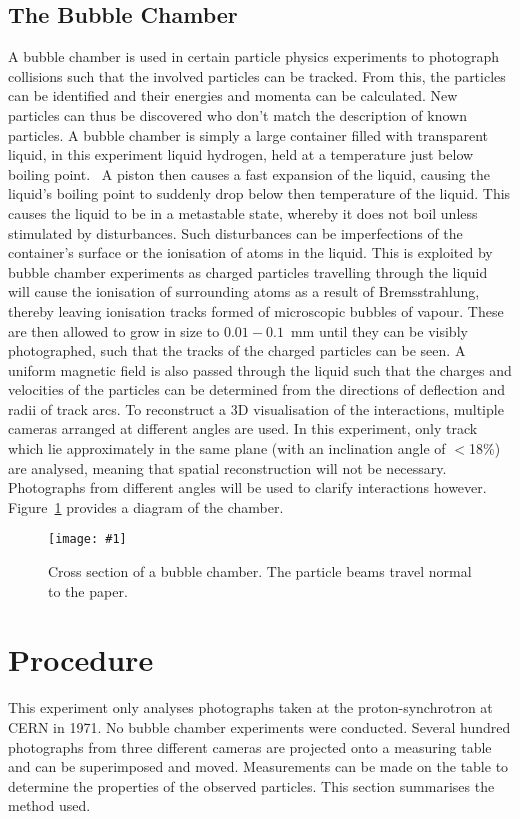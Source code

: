 \documentclass[twocolumn]{article}
\newcommand{\insertFigure}[1]{%
   \texttt{[image: \#1]}%
}
\begin{document}
\subsection{The Bubble Chamber}
A bubble chamber is used in certain particle physics experiments to photograph collisions such that the involved particles can be tracked. From this, the particles can be identified and their energies and momenta can be calculated. New particles can thus be discovered who don't match the description of known particles. A bubble chamber is simply a large container filled with transparent liquid, in this experiment liquid hydrogen, held at a temperature just below boiling point.~\cite{seul} A piston then causes a fast expansion of the liquid, causing the liquid's boiling point to suddenly drop below then temperature of the liquid. This causes the liquid to be in a metastable state, whereby it does not boil unless stimulated by disturbances. Such disturbances can be imperfections of the container's surface or the ionisation of atoms in the liquid. This is exploited by bubble chamber experiments as charged particles travelling through the liquid will cause the ionisation of surrounding atoms as a result of Bremsstrahlung, thereby leaving ionisation tracks formed of microscopic bubbles of vapour. These are then allowed to grow in size to $0.01-0.1$~mm until they can be visibly photographed, such that the tracks of the charged particles can be seen. A uniform magnetic field is also passed through the liquid such that the charges and velocities of the particles can be determined from the directions of deflection and radii of track arcs. To reconstruct a 3D visualisation of the interactions, multiple cameras arranged at different angles are used. In this experiment, only track which lie approximately in the same plane (with an inclination angle of $<$18\%) are analysed, meaning that spatial reconstruction will not be necessary. Photographs from different angles will be used to clarify interactions however. Figure~\ref{fig:bubble} provides a diagram of the chamber. 
\begin{figure}[!h]
	\centering
	\insertFigure{bubble.png}
	\caption{Cross section of a bubble chamber. The particle beams travel normal to the paper.~\cite{perkins}}
	\label{fig:bubble}
\end{figure}

\section{Procedure} \label{sec:Proc}
This experiment only analyses photographs taken at the proton-synchrotron at CERN in 1971. No bubble chamber experiments were conducted. Several hundred photographs from three different cameras are projected onto a measuring table and can be superimposed and moved. Measurements can be made on the table to determine the properties of the observed particles. This section summarises the method used.
\end{document}
